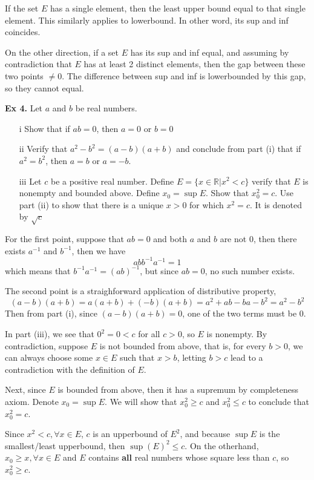 If the set $E$ has a single element, then the least upper bound equal to that single element. This similarly applies to lowerbound. In other word, its sup and inf coincides.

On the other direction, if a set $E$ has its sup and inf equal, and assuming by contradiction that $E$ has at least 2 distinct elements, then the gap between these two points $\neq 0$. The difference between sup and inf is lowerbounded by this gap, so they cannot equal.

\noindent \textbf{Ex 4.} Let $a$ and $b$ be real numbers.
\begin{itemize}
    \item[i] Show that if $ab=0$, then $a=0$ or $b=0$
    \item[ii] Verify that $a^2 -b^2=(a-b)(a+b)$ and conclude from part (i) that if $a^2=b^2$, then $a=b$ or $a=-b$.
    \item[iii] Let $c$ be a positive real number. Define $E=\{x\in \mathbb R | x^2 < c\}$ verify that $E$ is nonempty and bounded above. Define $x_0=\sup E$. Show that $x_0^2=c$. Use part (ii) to show that there is a unique $x>0$ for which $x^2=c$. It is denoted by $\sqrt{c}$
\end{itemize}
For the first point, suppose that $ab=0$ and both $a$ and $b$ are not 0, then there exists $a^{-1}$ and $b^{-1}$, then we have
\begin{equation*}
    abb^{-1}a^{-1} = 1
\end{equation*}
which means that $b^{-1}a^{-1}=(ab)^{-1}$, but since $ab=0$, no such number exists.

The second point is a straighforward application of distributive property,
\begin{equation*}
    (a-b)(a+b) = a(a+b) + (-b) (a+b) = a^2 + ab - ba - b^2 = a^2-b^2
\end{equation*}
Then from part (i), since $(a-b)(a+b)=0$, one of the two terms must be 0.

In part (iii), we see that $0^2=0 < c$ for all $c > 0$, so $E$ is nonempty. By contradiction, suppose $E$ is not bounded from above, that is, for every $b> 0$, we can always choose some $x\in E$ such that $x > b$, letting $b > c$ lead to a contradiction with the definition of $E$.

Next, since $E$ is bounded from above, then it has a supremum by completeness axiom. Denote $x_0=\sup E$. We will show that $x_0^2 \geq c$ and $x_0^2 \leq c$ to conclude that $x_0^2=c$.

Since $x^2<c, \forall x \in E$, $c$ is an upperbound of $E^2$, and because $\sup E$ is the smallest/least upperbound, then $\sup(E)^2 \leq c$. On the otherhand, $x_0 \geq x, \forall x \in E$ and $E$ contains \textbf{all} real numbers whose square less than $c$, so $x_0^2 \geq c$.

